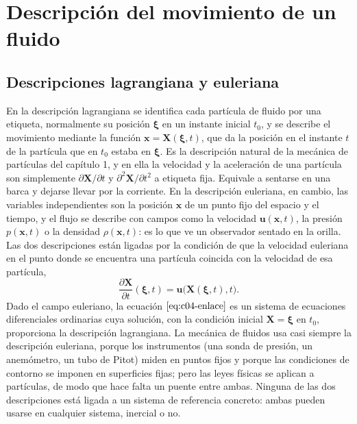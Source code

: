 \documentclass[10pt,openany]{book}
\begin{document}
\chapter{Descripción del movimiento de un fluido}
\label{chap:c04}


\section{Descripciones lagrangiana y euleriana}

En la descripción lagrangiana se identifica cada partícula de fluido por una etiqueta, normalmente su posición \(\boldsymbol{\xi}\) en un instante inicial \(t_0\), y se describe el movimiento mediante la función \(\mathbf{x} = \mathbf{X}(\boldsymbol{\xi}, t)\), que da la posición en el instante \(t\) de la partícula que en \(t_0\) estaba en \(\boldsymbol{\xi}\). Es la descripción natural de la mecánica de partículas del capítulo 1, y en ella la velocidad y la aceleración de una partícula son simplemente \(\partial\mathbf{X}/\partial t\) y \(\partial^{2}\mathbf{X}/\partial t^{2}\) a etiqueta fija. Equivale a sentarse en una barca y dejarse llevar por la corriente. En la descripción euleriana, en cambio, las variables independientes son la posición \(\mathbf{x}\) de un punto fijo del espacio y el tiempo, y el flujo se describe con campos como la velocidad \(\mathbf{u}(\mathbf{x}, t)\), la presión \(p(\mathbf{x}, t)\) o la densidad \(\rho(\mathbf{x}, t)\): es lo que ve un observador sentado en la orilla. Las dos descripciones están ligadas por la condición de que la velocidad euleriana en el punto donde se encuentra una partícula coincida con la velocidad de esa partícula,
\begin{equation}
\frac{\partial \mathbf{X}}{\partial t}(\boldsymbol{\xi}, t) = \mathbf{u}\big(\mathbf{X}(\boldsymbol{\xi}, t), t\big). \label{eq:c04-enlace}
\end{equation}
Dado el campo euleriano, la ecuación \(\eqref{eq:c04-enlace}\) es un sistema de ecuaciones diferenciales ordinarias cuya solución, con la condición inicial \(\mathbf{X} = \boldsymbol{\xi}\) en \(t_0\), proporciona la descripción lagrangiana. La mecánica de fluidos usa casi siempre la descripción euleriana, porque los instrumentos (una sonda de presión, un anemómetro, un tubo de Pitot) miden en puntos fijos y porque las condiciones de contorno se imponen en superficies fijas; pero las leyes físicas se aplican a partículas, de modo que hace falta un puente entre ambas. Ninguna de las dos descripciones está ligada a un sistema de referencia concreto: ambas pueden usarse en cualquier sistema, inercial o no.
\end{document}
